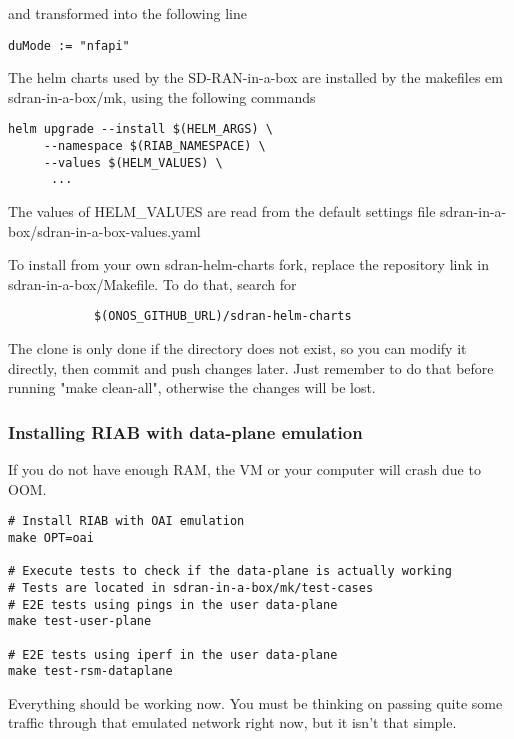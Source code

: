 \documentclass{article}
\begin{document}
            and transformed into the following line

\begin{verbatim}
duMode := "nfapi"
\end{verbatim}


            The helm charts used by the SD-RAN-in-a-box are installed by
            the makefiles em sdran-in-a-box/mk, using the following commands

\begin{verbatim}
helm upgrade --install $(HELM_ARGS) \
     --namespace $(RIAB_NAMESPACE) \
     --values $(HELM_VALUES) \
      ...
\end{verbatim}

            The values of HELM\_VALUES are read from the default settings file
            sdran-in-a-box/sdran-in-a-box-values.yaml

            To install from your own sdran-helm-charts fork, replace the repository link in
            sdran-in-a-box/Makefile. To do that, search for

            \begin{verbatim}
            $(ONOS_GITHUB_URL)/sdran-helm-charts
            \end{verbatim}

            The clone is only done if the directory does not exist, so you can modify it
            directly, then commit and push changes later. Just remember to do that before
            running "make clean-all", otherwise the changes will be lost.

        \subsubsection{Installing RIAB with data-plane emulation}
            If you do not have enough RAM, the VM or your computer will crash due to OOM.

\begin{verbatim}
# Install RIAB with OAI emulation
make OPT=oai

# Execute tests to check if the data-plane is actually working
# Tests are located in sdran-in-a-box/mk/test-cases
# E2E tests using pings in the user data-plane
make test-user-plane

# E2E tests using iperf in the user data-plane
make test-rsm-dataplane
\end{verbatim}

            Everything should be working now. You must be thinking on passing quite
            some traffic through that emulated network right now, but it isn't that simple.
\end{document}
